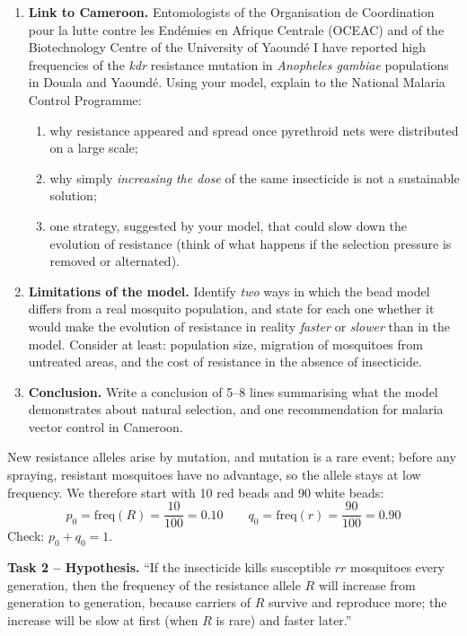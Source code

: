 \documentclass[11pt]{article}
\newcounter{popsec}
\newcounter{popsub}
\newcommand{\courssub}[1]{%
  \stepcounter{popsub}%
  \par\vspace{9pt}\noindent{\popxbold\fontsize{11.5}{13}\selectfont\color{popink}{\color{poporange}\thepopsec.\thepopsub}\hspace{6pt}#1}\par\nopagebreak\vspace{4pt}
}
\begin{document}
\begin{enumerate}
\item \textbf{Link to Cameroon.} Entomologists of the Organisation de Coordination pour la lutte contre les End\'emies en Afrique Centrale (OCEAC) and of the Biotechnology Centre of the University of Yaound\'e I have reported high frequencies of the \emph{kdr} resistance mutation in \emph{Anopheles gambiae} populations in Douala and Yaound\'e. Using your model, explain to the National Malaria Control Programme:
\begin{enumerate}
\item why resistance appeared and spread once pyrethroid nets were distributed on a large scale;
\item why simply \emph{increasing the dose} of the same insecticide is not a sustainable solution;
\item one strategy, suggested by your model, that could slow down the evolution of resistance (think of what happens if the selection pressure is removed or alternated).
\end{enumerate}

\item \textbf{Limitations of the model.} Identify \emph{two} ways in which the bead model differs from a real mosquito population, and state for each one whether it would make the evolution of resistance in reality \emph{faster} or \emph{slower} than in the model. Consider at least: population size, migration of mosquitoes from untreated areas, and the cost of resistance in the absence of insecticide.

\item \textbf{Conclusion.} Write a conclusion of 5--8 lines summarising what the model demonstrates about natural selection, and one recommendation for malaria vector control in Cameroon.
\end{enumerate}

\courssub{Model answer}

\begin{methode}
New resistance alleles arise by mutation, and mutation is a rare event; before any spraying, resistant mosquitoes have no advantage, so the allele stays at low frequency. We therefore start with 10 red beads and 90 white beads:
\[
p_0 = \mathrm{freq}(R) = \frac{10}{100} = 0.10 \qquad q_0 = \mathrm{freq}(r) = \frac{90}{100} = 0.90
\]
Check: $p_0 + q_0 = 1$.
\end{methode}

\textbf{Task 2 -- Hypothesis.} ``If the insecticide kills susceptible $rr$ mosquitoes every generation, then the frequency of the resistance allele $R$ will increase from generation to generation, because carriers of $R$ survive and reproduce more; the increase will be slow at first (when $R$ is rare) and faster later.''
\end{document}
